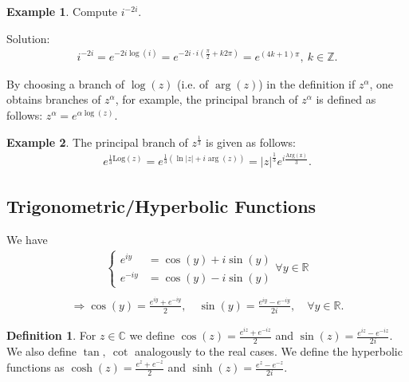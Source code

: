 \documentclass[12pt, a4paper]{article}
\theoremstyle{plain}
\theoremstyle{definition}
\newtheorem{definition}{Definition} %
\newtheorem{example}{Example} %
\begin{document}
			\begin{example}
				Compute $i^{-2i}$.

				Solution:
				\begin{align*}
					i^{-2i} = e^{-2i\log(i)} = e^{-2i\cdot i(\frac{\pi}{2}+k2\pi)} = e^{(4k+1)\pi},\:k\in \mathbb{Z}.
				\end{align*}
			\end{example}

			By choosing a branch of $\log(z)$ (i.e. of $\arg(z)$) in the definition if $z^\alpha$, one obtains branches of $z^\alpha$, for example, the principal branch of $z^\alpha$ is defined as follows: $z^\alpha = e^{\alpha\log(z)}$.

			\begin{example}
			 	The principal branch of $z^{\frac{1}{3}}$ is given as follows:
			 	\begin{align*}
			 	 	e^{\frac{1}{3}\mathrm{Log}(z)} = e^{\frac{1}{3}(\ln|z|+i\arg(z))} = |z|^{\frac{1}{3}}e^{i\frac{\mathrm{Arg(z)}}{3}}.
			 	 \end{align*} 
			 \end{example} 

		\subsection{Trigonometric/Hyperbolic Functions} %
		\label{sub:trigonometric_hyperbolic_functions}
			We have
			\begin{align*}
				\begin{cases}
					e^{iy} &= \cos(y) + i\sin(y)\\
					e^{-iy} &= \cos(y) - i\sin(y)
				\end{cases}\forall y\in \mathbb{R} \\
			\end{align*}
			\begin{align*}
				\Rightarrow 
				\cos(y) = \frac{e^{iy}+e^{-iy}}{2},\quad
				\sin(y) = \frac{e^{iy}-e^{-iy}}{2i},\quad \forall y\in \mathbb{R}.
			\end{align*}
			\begin{definition}
				For $z\in \mathbb{C}$ we define $\cos(z) = \frac{e^{iz}+e^{-iz}}{2}$ and $\sin(z) = \frac{e^{iz}-e^{-iz}}{2i}$. We also define $\tan,\:\cot$ analogously to the real cases. We define the hyperbolic functions as $\cosh(z) = \frac{e^{z}+e^{-z}}{2}$ and $\sinh(z) = \frac{e^{z}-e^{-z}}{2i}$.\\
			\end{definition}
\end{document}
